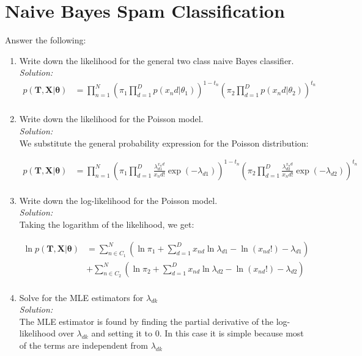 \documentclass[12pt,a4paper]{article}
\begin{document}
	\section{Naive Bayes Spam Classification}
	Answer the following:
	\begin{enumerate}
		\item Write down the likelihood for the general two class naive Bayes classifier. \\
		\emph{Solution:} \\
		
		\begin{align*}
			p(\textbf{T},\textbf{X} | \boldsymbol{\theta}) &= \prod_{n=1}^{N}(\pi_1 \prod_{d=1}^{D}p(x_nd | \theta_1))^{1 - t_n} (\pi_2 \prod_{d=1}^{D}p(x_nd | \theta_2))^{t_n} \\
		\end{align*}		  
		
		\item Write down the likelihood for the Poisson model. \\
		\emph{Solution:} \\
		We substitute the general probability expression for the Poisson distribution:
		
		\begin{align*}
			p(\textbf{T},\textbf{X} | \boldsymbol{\theta}) &= \prod_{n=1}^{N}(\pi_1 \prod_{d=1}^{D}\frac{\lambda_{d1}^{x_nd}}{x_nd!}\exp(-\lambda_{d1}))^{1 - t_n} (\pi_2 \prod_{d=1}^{D}\frac{\lambda_{d2}^{x_nd}}{x_nd!}\exp(-\lambda_{d2}))^{t_n}\\
		\end{align*}
		
		\item Write down the log-likelihood for the Poisson model. \\
		\emph{Solution:} \\
		Taking the logarithm of the likelihood, we get:
		
		\begin{align*}
			\ln p(\textbf{T},\textbf{X} | \boldsymbol{\theta}) &= \sum_{n \in C_1}^{N}(\ln\pi_1 + \sum_{d = 1}^{D}x_{nd}\ln\lambda_{d1} - \ln(x_{nd}!) - \lambda_{d1}) \\
			&+ \sum_{n \in C_2}^{N}(\ln\pi_2 + \sum_{d=1}^{D} x_{nd}\ln\lambda_{d2} - \ln(x_{nd}!) - \lambda_{d2}) \\
		\end{align*}
		
		\item Solve for the MLE estimators for $\lambda_{dk}$ \\
		\emph{Solution:} \\
		The MLE estimator is found by finding the partial derivative of the log-likelihood over $\lambda_{dk}$ and setting it to $0$. In this case it is simple because most of the terms are independent from $\lambda_{dk}$
		

\end{enumerate}
\end{document}
